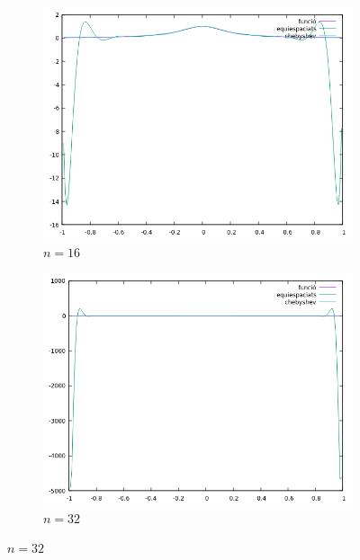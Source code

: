 \documentclass[a4paper,11pt]{article}
\begin{document}
  \begin{figure}[H]
  \begin{subfigure}{0.49\textwidth}
    \includegraphics[width = 0.9 \linewidth]{imatges/plot16.png}
  \centering
  \caption*{$n = 16$}
  \end{subfigure}
  \begin{subfigure}{0.49\textwidth}
    \includegraphics[width = 0.9 \linewidth]{imatges/plot32.png}
  \centering
  \caption*{$n = 32$}
  \end{subfigure}
  \end{figure}
\end{document}
